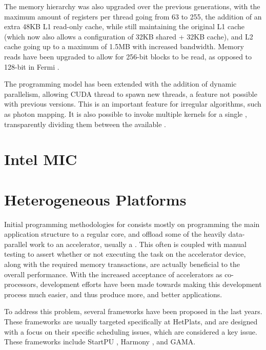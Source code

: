 \documentclass[main.tex]{subfiles}
\begin{document}

The memory hierarchy was also upgraded over the previous generations, with the maximum amount of registers per thread going from 63 to 255, the addition of an extra 48KB L1 read-only cache, while still maintaining the original L1 cache (which now also allows a configuration of 32KB shared + 32KB cache), and L2 cache going up to a maximum of 1.5MB with increased bandwidth. Memory reads have been upgraded to allow for 256-bit blocks to be read, as opposed to 128-bit in Fermi \cite{NVIDIA:kepler}.

The programming model has been extended with the addition of dynamic parallelism, allowing \acs{CUDA} thread to spawn new threads, a feature not possible with previous versions. This is an important feature for irregular algorithms, such as photon mapping. It is also possible to invoke multiple kernels for a single \gpu, transparently dividing them between the available \smxs.


\section{Intel MIC}


\section{Heterogeneous Platforms}

Initial programming methodologies for \hetplats consists mostly on programming the main application structure to a regular \cpu core, and offload some of the heavily data-parallel work to an accelerator, usually a \gpu. This often is coupled with manual testing to assert whether or not executing the task on the accelerator device, along with the required memory transactions, are actually beneficial to the overall performance.
With the increased acceptance of accelerators as co-processors, development efforts have been made towards making this development process much easier, and thus produce more, and better applications.

To address this problem, several frameworks have been proposed in the last years. These frameworks are usually targeted specifically at \acp{HetPlat}, and are designed with a focus on their specific scheduling issues, which are considered a key issue. These frameworks include StartPU \cite{augonnet2011starpu}, Harmony \cite{diamos2008harmony}, and GAMA. 
\end{document}
